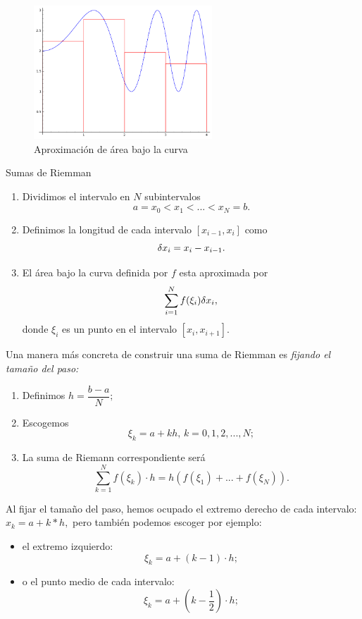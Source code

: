 	\begin{figure}
		\centering
		\includegraphics[height=5cm,keepaspectratio=true]{./calculo/tmp_h5b5ua.png}
		\caption{Aproximación de área bajo la curva}
		\label{fig:ayr:23.2}
	\end{figure}
	



	\begin{algoritmo}{Sumas de Riemman}
		\label{suma:riemann}
		\begin{enumerate}
			\item Dividimos el intervalo en $N$ subintervalos
			$$a=x_{0}<x_{1}<...<x_{N}=b.$$
			
			\item Definimos la longitud de cada intervalo $[x_{i-1},x_{i}]$ como $$\delta x_{i}=x_{i}-x_{i-1}.$$
			
			\item El área bajo la curva definida por $f$ esta aproximada por
			$$\sum_{i=1}^{N} f(\xi_{i})\delta x_{i},$$
			donde $\xi_{i}$ es un punto en el intervalo $[x_{i},x_{i+1}].$
		\end{enumerate}
	\end{algoritmo}



	Una manera más concreta de construir una suma de Riemman es \emph{fijando el tamaño del paso:}
	\begin{enumerate}
		\item Definimos $h=\dfrac{b-a}{N};$ 
		\item Escogemos $$\xi_{k}=a+kh, \, k=0,1,2,...,N;$$
		\item La suma de Riemann correspondiente será
		$$
		\sum_{k=1}^{N}f(\xi_{k})\cdot h=h\left( f(\xi_{1})+...+f(\xi_{N}) \right).
		$$
	\end{enumerate}
	



	Al fijar el tamaño del paso, hemos ocupado el extremo derecho de cada intervalo: $x_{k}=a+k*h,$ pero también podemos escoger por ejemplo:
	\begin{itemize}
		\item el extremo izquierdo:
		$$\xi_{k}=a+(k-1)\cdot h;$$ 
		\item o el punto medio de cada intervalo:
		$$\xi_{k}=a+\left( k-\dfrac{1}{2} \right) \cdot h;$$
	\end{itemize}
	




